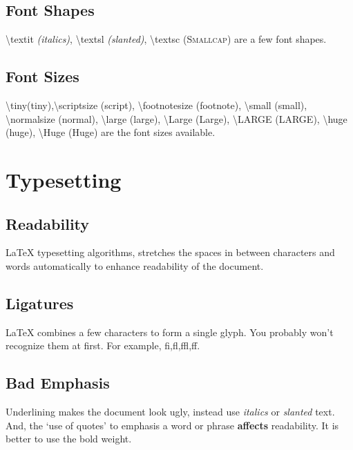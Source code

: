 \documentclass{article}
\begin{document}
\subsection{Font Shapes}
\textbackslash textit \textit{(italics)}, \textbackslash textsl \textsl{(slanted)}, \textbackslash textsc \textsc{(Smallcap)} are a few font shapes.

\subsection{Font Sizes}
\textbackslash tiny\tiny (tiny),\textbackslash scriptsize \scriptsize (script), \textbackslash footnotesize \footnotesize (footnote), \textbackslash small \small (small), \textbackslash normalsize \normalsize (normal), \textbackslash large \large (large), \textbackslash Large \Large (Large), \textbackslash LARGE \LARGE (LARGE), \textbackslash huge \huge (huge), \textbackslash Huge \Huge (Huge) \normalsize are the font sizes available.

\section{Typesetting}
\subsection{Readability}
\LaTeX{} typesetting algorithms, stretches the spaces in between characters and words automatically to enhance readability of the document.

\subsection{Ligatures}
\LaTeX{} combines a few characters to form a single glyph. You probably won't recognize them at first. For example, fi,fl,ffl,ff.

\subsection{Bad Emphasis}
Underlining makes the document look ugly, instead use \textit{italics} or \textsl{slanted} text. And, the `use of quotes' to emphasis a word or phrase \textbf{affects} readability. It is better to use the bold weight.
\end{document}
